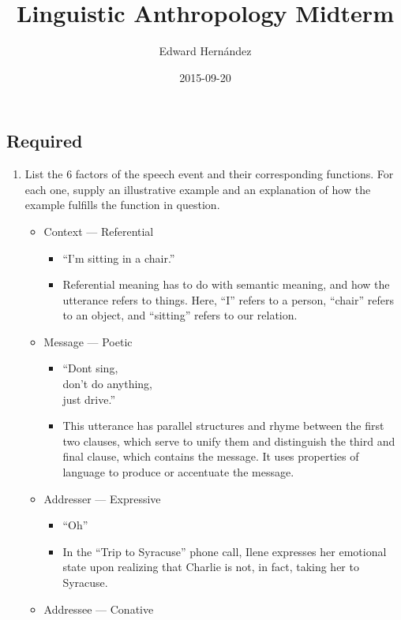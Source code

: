 \documentclass[doc,12pt]{apa6}
\providecommand{\tightlist}{%
  \setlength{\itemsep}{0pt}\setlength{\parskip}{0pt}}
\begin{document}
\title{Linguistic Anthropology Midterm}
\author{Edward Hern\'{a}ndez}
\date{2015-09-20}
\maketitle

\subsection{Required}\label{required}

\begin{enumerate}
\def\labelenumi{\arabic{enumi}.}
\tightlist
\item
  List the 6 factors of the speech event and their corresponding
  functions. For each one, supply an illustrative example and an
  explanation of how the example fulfills the function in question.

  \begin{itemize}
  \tightlist
  \item
    Context --- Referential

    \begin{itemize}
    \tightlist
    \item
      ``I'm sitting in a chair.''
    \item
      Referential meaning has to do with semantic meaning, and how the
      utterance refers to things. Here, ``I'' refers to a person,
      ``chair'' refers to an object, and ``sitting'' refers to our
      relation.
    \end{itemize}
  \item
    Message --- Poetic

    \begin{itemize}
    \tightlist
    \item
      ``Dont sing,\\
      don't do anything,\\
      just drive.''
    \item
      This utterance has parallel structures and rhyme between the first
      two clauses, which serve to unify them and distinguish the third
      and final clause, which contains the message. It uses properties
      of language to produce or accentuate the message.
    \end{itemize}
  \item
    Addresser --- Expressive

    \begin{itemize}
    \tightlist
    \item
      ``Oh''
    \item
      In the ``Trip to Syracuse'' phone call, Ilene expresses her
      emotional state upon realizing that Charlie is not, in fact,
      taking her to Syracuse.
    \end{itemize}
  \item
    Addressee --- Conative


\end{itemize}
\end{enumerate}
\end{document}
